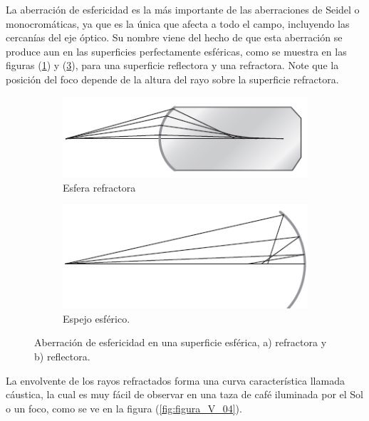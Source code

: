 \documentclass[14pt]{extarticle}
\begin{document}
La aberración de esfericidad es la más importante de las aberraciones de Seidel o monocromáticas, ya que es la única que afecta a todo el campo, incluyendo las cercanías del eje óptico. Su nombre viene del hecho de que esta aberración se produce aun en las superficies perfectamente esféricas, como se muestra en las figuras (\ref{fig:figura_V_03a}) y (\ref{fig:figura_V_03b}), para una superficie reflectora y una refractora. Note que la posición del foco depende de la altura del rayo sobre la superficie refractora.
\begin{figure}[H]
\begin{subfigure}{0.5\linewidth}
    \centering
    \includegraphics[scale=0.8]{Imagenes/Aberraciones_03a.png}
    \caption{Esfera refractora}
    \label{fig:figura_V_03a}
\end{subfigure}%
\begin{subfigure}{0.5\linewidth}
    \centering
    \includegraphics[scale=0.8]{Imagenes/Aberraciones_03b.png}
    \caption{Espejo esférico.}
    \label{fig:figura_V_03b}
\end{subfigure}
\caption{Aberración de esfericidad en una superficie esférica, a) refractora y b) reflectora.}
\end{figure}
La envolvente de los rayos refractados forma una curva característica llamada cáustica, la cual es muy fácil de observar en una taza de café iluminada por el Sol o un foco, como se ve en la figura (\ref{fig:figura_V_04}). 
\end{document}
